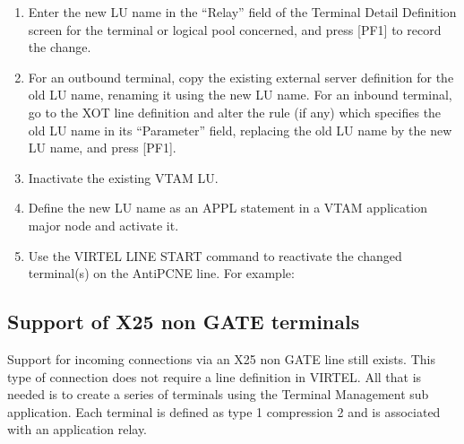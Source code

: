 \documentclass[letterpaper,10pt,english]{sphinxmanual}
\begin{document}
\sphinxAtStartPar
{}
\begin{enumerate}
%
\item {} 
\sphinxAtStartPar
Enter the new LU name in the “Relay” field of the Terminal Detail Definition screen for the terminal or logical pool concerned, and press {[}PF1{]} to record the change.

\item {} 
\sphinxAtStartPar
For an outbound terminal, copy the existing external server definition for the old LU name, renaming it using the new LU name. For an inbound terminal, go to the XOT line definition and alter the rule (if any) which specifies the old LU name in its “Parameter” field, replacing the old LU name by the new LU name, and press {[}PF1{]}.

\item {} 
\sphinxAtStartPar
Inactivate the existing VTAM LU.

\item {} 
\sphinxAtStartPar
Define the new LU name as an APPL statement in a VTAM application major node and activate it.

\item {} 
\sphinxAtStartPar
Use the VIRTEL LINE START command to reactivate the changed terminal(s) on the AntiPCNE line. For example: 

\end{enumerate}

\ignorespaces 

\subsection{Support of X25 non GATE terminals}
\label{\detokenize{connectivity_guide:support-of-x25-non-gate-terminals}}\label{\detokenize{connectivity_guide:index-87}}
\sphinxAtStartPar
Support for incoming connections via an X25 non GATE line still exists. This type of connection does not require a line definition in VIRTEL. All that is needed is to create a series of terminals using the Terminal Management sub\sphinxhyphen{} application. Each terminal is defined as type 1 compression 2 and is associated with an application relay.
\end{document}
